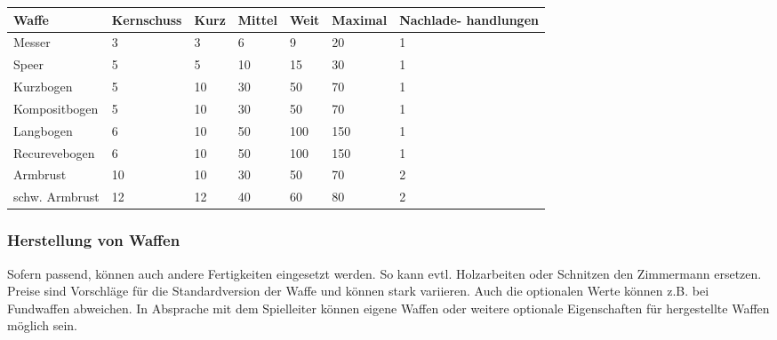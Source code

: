 \documentclass{article}
\begin{document}
\begin{small}
\begin{tabular}{|m{25mm}|m{20mm}|m{15mm}|m{15mm}|m{15mm}|m{15mm}|m{20mm}|}
\hline
\textbf{Waffe}&\textbf{Kernschuss}&\textbf{Kurz}&\textbf{Mittel}&\textbf{Weit}&\textbf{Maximal}&\textbf{Nachlade- handlungen}\\
\hline
\hline
Messer&3&3&6&9&20&1\\
\hline
Speer&5&5&10&15&30&1\\
\hline
Kurzbogen&5&10&30&50&70&1\\
\hline
Kompositbogen&5&10&30&50&70&1\\
\hline
Langbogen&6&10&50&100&150&1\\
\hline
Recurevebogen&6&10&50&100&150&1\\
\hline
Armbrust&10&10&30&50&70&2\\
\hline
schw. Armbrust&12&12&40&60&80&2\\
\hline
\end{tabular}
\end{small}

\subsubsection{Herstellung von Waffen}

Sofern passend, können auch andere Fertigkeiten eingesetzt werden. So kann evtl. Holzarbeiten oder Schnitzen den Zimmermann
ersetzen. Preise sind Vorschläge für die Standardversion der Waffe und können stark variieren. Auch die optionalen
Werte können z.B. bei Fundwaffen abweichen. In Absprache mit dem Spielleiter können eigene Waffen oder weitere optionale
Eigenschaften für hergestellte Waffen möglich sein.
\end{document}
